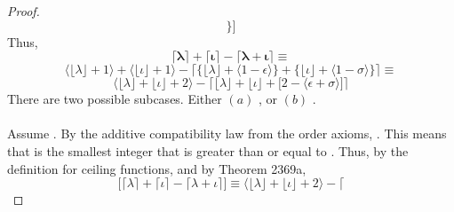 \documentclass[preview]{standalone}
\begin{document}
\begin{proof}
\begin{equation*}
            \Big\}
        \bigg]
    \end{equation*} 
    Thus, 
    \begin{equation*}
        \bm{
            \lceil \lambda \rceil 
                + 
            \lceil \iota \rceil 
                - 
            \lceil \lambda + \iota \rceil 
        }
            \equiv
    \end{equation*}
    \begin{equation*}
        \Big \langle \lfloor \lambda \rfloor + 1 \Big \rangle 
            + 
        \Big \langle \lfloor \iota \rfloor + 1 \Big \rangle
            - 
        \bigg \lceil
            \Big\{
                \lfloor \lambda \rfloor
                    + 
                \big \langle 1 - \epsilon \big \rangle
            \Big\}
                +
            \Big\{
                \lfloor \iota \rfloor 
                    + 
                \big \langle 1 - \sigma \big \rangle
            \Big\}
        \bigg \rceil
            \equiv
    \end{equation*} 
    \begin{equation*}
        \Big \langle \lfloor \lambda \rfloor + \lfloor \iota \rfloor + 2 \Big \rangle
            - 
        \bigg \lceil
            \lfloor \lambda \rfloor 
                + 
            \lfloor \iota \rfloor 
                + 
            \Big[
                2 
                    - 
                \big \langle \epsilon + \sigma \big \rangle
            \Big]
        \bigg \rceil
    \end{equation*} 
    There are two possible subcases. Either 
    $(a)$ , 
    or $(b)$ .
    \\ \\
     Assume 
    . 
    By the additive compatibility law from the order axioms, 
    . 
    This means that  is the smallest integer that is greater than or equal to 
    .
    Thus, by the definition for ceiling functions, 
    and by Theorem 2369a,
    \begin{equation*}
        \Big[ 
            \lceil \lambda \rceil 
                + 
            \lceil \iota \rceil 
                - 
            \lceil \lambda + \iota \rceil 
        \Big]
            \equiv
        \Big \langle \lfloor \lambda \rfloor + \lfloor \iota \rfloor + 2 \Big \rangle
            - 
        \Big \lceil

\end{equation*}
\end{proof}
\end{document}
